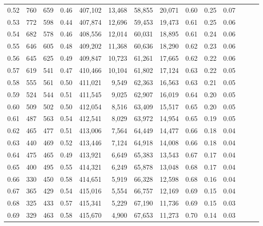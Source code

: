 \begin{tabular}{rrrrrrrrrrrrrr}
0.52 &     760 &    659 &  0.46 &  407,102 &   13,468 &  58,855 &  20,071 &  0.60 &  0.25 &      0.07 \\
0.53 &     772 &    598 &  0.44 &  407,874 &   12,696 &  59,453 &  19,473 &  0.61 &  0.25 &      0.06 \\
0.54 &     682 &    578 &  0.46 &  408,556 &   12,014 &  60,031 &  18,895 &  0.61 &  0.24 &      0.06 \\
0.55 &     646 &    605 &  0.48 &  409,202 &   11,368 &  60,636 &  18,290 &  0.62 &  0.23 &      0.06 \\
0.56 &     645 &    625 &  0.49 &  409,847 &   10,723 &  61,261 &  17,665 &  0.62 &  0.22 &      0.06 \\
0.57 &     619 &    541 &  0.47 &  410,466 &   10,104 &  61,802 &  17,124 &  0.63 &  0.22 &      0.05 \\
0.58 &     555 &    561 &  0.50 &  411,021 &    9,549 &  62,363 &  16,563 &  0.63 &  0.21 &      0.05 \\
0.59 &     524 &    544 &  0.51 &  411,545 &    9,025 &  62,907 &  16,019 &  0.64 &  0.20 &      0.05 \\
0.60 &     509 &    502 &  0.50 &  412,054 &    8,516 &  63,409 &  15,517 &  0.65 &  0.20 &      0.05 \\
0.61 &     487 &    563 &  0.54 &  412,541 &    8,029 &  63,972 &  14,954 &  0.65 &  0.19 &      0.05 \\
0.62 &     465 &    477 &  0.51 &  413,006 &    7,564 &  64,449 &  14,477 &  0.66 &  0.18 &      0.04 \\
0.63 &     440 &    469 &  0.52 &  413,446 &    7,124 &  64,918 &  14,008 &  0.66 &  0.18 &      0.04 \\
0.64 &     475 &    465 &  0.49 &  413,921 &    6,649 &  65,383 &  13,543 &  0.67 &  0.17 &      0.04 \\
0.65 &     400 &    495 &  0.55 &  414,321 &    6,249 &  65,878 &  13,048 &  0.68 &  0.17 &      0.04 \\
0.66 &     330 &    450 &  0.58 &  414,651 &    5,919 &  66,328 &  12,598 &  0.68 &  0.16 &      0.04 \\
0.67 &     365 &    429 &  0.54 &  415,016 &    5,554 &  66,757 &  12,169 &  0.69 &  0.15 &      0.04 \\
0.68 &     325 &    433 &  0.57 &  415,341 &    5,229 &  67,190 &  11,736 &  0.69 &  0.15 &      0.03 \\
0.69 &     329 &    463 &  0.58 &  415,670 &    4,900 &  67,653 &  11,273 &  0.70 &  0.14 &      0.03 \\

\end{tabular}

